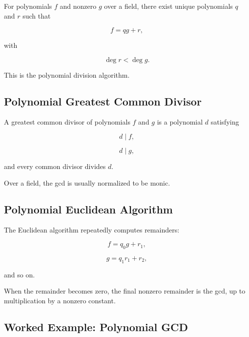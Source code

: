 For polynomials \(f\) and nonzero \(g\) over a field, there exist unique
polynomials \(q\) and \(r\) such that

\[
\boxed{
f
=
qg+r,
}
\]

with

\[
\boxed{
\deg r
<
\deg g.
}
\]

This is the polynomial division algorithm.

\subsection{Polynomial Greatest Common Divisor}
\label{subsec:polynomial-gcd}

A greatest common divisor of polynomials \(f\) and \(g\) is a polynomial
\(d\) satisfying

\[
d\mid f,
\]

\[
d\mid g,
\]

and every common divisor divides \(d\).

Over a field, the gcd is usually normalized to be monic.

\subsection{Polynomial Euclidean Algorithm}
\label{subsec:polynomial-euclidean-algorithm}

The Euclidean algorithm repeatedly computes remainders:

\[
f=q_0g+r_1,
\]

\[
g=q_1r_1+r_2,
\]

and so on.

When the remainder becomes zero, the final nonzero remainder is the gcd,
up to multiplication by a nonzero constant.

\subsection{Worked Example: Polynomial GCD}
\label{subsec:worked-polynomial-gcd}

